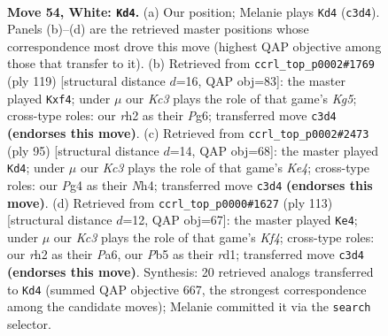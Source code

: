\documentclass[11pt]{article}
\begin{document}
\clearpage

\begin{figure}[p]\centering
\begin{subfigure}{0.46\textwidth}\centering
\resizebox{\linewidth}{!}{%
\newchessgame
\chessboard[
  setfen={8/R7/6k1/1P1n4/2p3P1/P1K5/7r/8 w - - 0 54},
  showmover=false,
  pgfstyle=straightmove, color=movearrow, markmove={c3-d4}
]}
\caption{}
\end{subfigure}\hfill
\begin{subfigure}{0.46\textwidth}\centering
\resizebox{\linewidth}{!}{%
\newchessgame
\chessboard[
  setfen={8/5p2/6p1/8/5Pk1/1p2N3/1P4K1/8 b - - 0 60},
  showmover=false,
  pgfstyle=straightmove, color=movearrow, markmove={g4-f4}
]}
\caption{}
\end{subfigure}
\\[4pt]
\begin{subfigure}{0.46\textwidth}\centering
\resizebox{\linewidth}{!}{%
\newchessgame
\chessboard[
  setfen={8/5N1p/R7/4k3/5p1n/5P1P/2r5/5K2 b - - 3 48},
  showmover=false,
  pgfstyle=straightmove, color=movearrow, markmove={e5-d4}
]}
\caption{}
\end{subfigure}\hfill
\begin{subfigure}{0.46\textwidth}\centering
\resizebox{\linewidth}{!}{%
\newchessgame
\chessboard[
  setfen={8/8/p7/5k1p/P7/2K1N1P1/r6p/3R4 b - - 4 57},
  showmover=false,
  pgfstyle=straightmove, color=movearrow, markmove={f5-e4}
]}
\caption{}
\end{subfigure}
\caption{\textbf{Move 54, White: \texttt{Kd4}.} (a) Our position; Melanie plays \texttt{Kd4} (\texttt{c3d4}). Panels (b)--(d) are the retrieved master positions whose correspondence most drove this move (highest QAP objective among those that transfer to it). (b) Retrieved from \texttt{ccrl\_top\_p0002\#1769} (ply 119) [structural distance $d$=16, QAP obj=83]: the master played \texttt{Kxf4}; under $\mu$ our \emph{Kc3} plays the role of that game's \emph{Kg5}; cross-type roles: our \emph{r}h2 as their \emph{P}g6; transferred move \texttt{c3d4} \textbf{(endorses this move)}. (c) Retrieved from \texttt{ccrl\_top\_p0002\#2473} (ply 95) [structural distance $d$=14, QAP obj=68]: the master played \texttt{Kd4}; under $\mu$ our \emph{Kc3} plays the role of that game's \emph{Ke4}; cross-type roles: our \emph{P}g4 as their \emph{N}h4; transferred move \texttt{c3d4} \textbf{(endorses this move)}. (d) Retrieved from \texttt{ccrl\_top\_p0000\#1627} (ply 113) [structural distance $d$=12, QAP obj=67]: the master played \texttt{Ke4}; under $\mu$ our \emph{Kc3} plays the role of that game's \emph{Kf4}; cross-type roles: our \emph{r}h2 as their \emph{P}a6, our \emph{P}b5 as their \emph{r}d1; transferred move \texttt{c3d4} \textbf{(endorses this move)}. Synthesis: 20 retrieved analogs transferred to \texttt{Kd4} (summed QAP objective 667, the strongest correspondence among the candidate moves); Melanie committed it via the \texttt{search} selector.}
\label{fig:thought-m106}
\end{figure}
\end{document}
